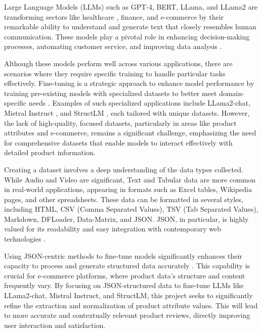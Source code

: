 Large Language Models (LLMs) such as GPT-4, BERT, LLama, and LLama2 are transforming sectors like healthcare \cite{he2023survey} \cite{REDDY2023101304}, finance, and e-commerce by their remarkable ability to understand and generate text that closely resembles human communication. These models play a pivotal role in enhancing decision-making processes, automating customer service, and improving data analysis \cite{Varshney_2024}.

Although these models perform well across various applications, there are scenarios where they require specific training to handle particular tasks effectively. Fine-tuning is a strategic approach to enhance model performance by training pre-existing models with specialized datasets to better meet domain-specific needs \cite{Bergmann_2024}. Examples of such specialized applications include LLama2-chat\cite{touvron2023llama}, Mistral Instruct \cite{jiang2023mistral}, and StructLM \cite{zhuang2024structlm}, each tailored with unique datasets. However, the lack of high-quality, focused datasets, particularly in areas like product attributes and e-commerce, remains a significant challenge, emphasizing the need for comprehensive datasets that enable models to interact effectively with detailed product information.

Creating a dataset involves a deep understanding of the data types collected. While Audio and Video are significant, Text and Tabular data are more common in real-world applications, appearing in formats such as Excel tables, Wikipedia pages, and other spreadsheets. These data can be formatted in several styles, including HTML, CSV (Comma Separated Values), TSV (Tab Separated Values), Markdown, DFLoader, Data-Matrix, and JSON. JSON, in particular, is highly valued for its readability and easy integration with contemporary web technologies \cite{singha2023tabular}.

Using JSON-centric methods to fine-tune models significantly enhances their capacity to process and generate structured data accurately \cite{gao2024jsontuning}. This capability is crucial for e-commerce platforms, where product data's structure and content frequently vary. By focusing on JSON-structured data to fine-tune LLMs like LLama2-chat, Mistral Instruct, and StructLM, this project seeks to significantly refine the extraction and normalization of product attribute values. This will lead to more accurate and contextually relevant product reviews, directly improving user interaction and satisfaction.